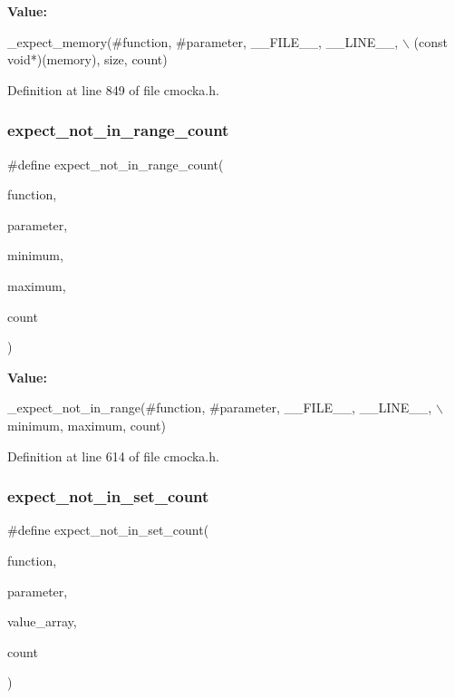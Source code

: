 {\bfseries Value\+:}
\begin{DoxyCode}
\_expect\_memory(#\textcolor{keyword}{function}, #parameter, \_\_FILE\_\_, \_\_LINE\_\_, \(\backslash\)
                   (\textcolor{keyword}{const} \textcolor{keywordtype}{void}*)(memory), size, count)
\end{DoxyCode}


Definition at line 849 of file cmocka.\+h.

\mbox{\label{group__cmocka__param_gaeb2494051abcdaf735fc287ebebbb4a3}} 
\subsubsection{\texorpdfstring{expect\+\_\+not\+\_\+in\+\_\+range\+\_\+count}{expect\_not\_in\_range\_count}}
{\footnotesize\ttfamily \#define expect\+\_\+not\+\_\+in\+\_\+range\+\_\+count(\begin{DoxyParamCaption}\item[{}]{function,  }\item[{}]{parameter,  }\item[{}]{minimum,  }\item[{}]{maximum,  }\item[{}]{count }\end{DoxyParamCaption})}

{\bfseries Value\+:}
\begin{DoxyCode}
\_expect\_not\_in\_range(#\textcolor{keyword}{function}, #parameter, \_\_FILE\_\_, \_\_LINE\_\_, \(\backslash\)
                         minimum, maximum, count)
\end{DoxyCode}


Definition at line 614 of file cmocka.\+h.

\mbox{\label{group__cmocka__param_ga522bec5b0b5b603274370676e57f6dc0}} 
\subsubsection{\texorpdfstring{expect\+\_\+not\+\_\+in\+\_\+set\+\_\+count}{expect\_not\_in\_set\_count}}
{\footnotesize\ttfamily \#define expect\+\_\+not\+\_\+in\+\_\+set\+\_\+count(\begin{DoxyParamCaption}\item[{}]{function,  }\item[{}]{parameter,  }\item[{}]{value\+\_\+array,  }\item[{}]{count }\end{DoxyParamCaption})}


